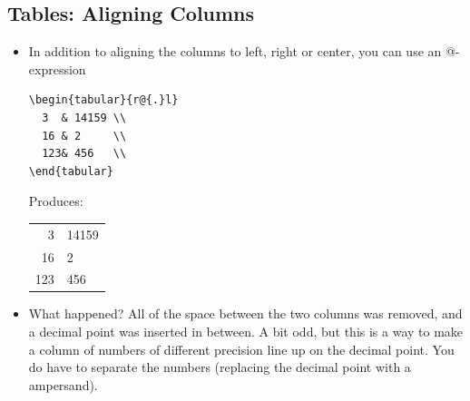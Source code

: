 \documentclass[usenames,dvipsnames]{beamer}
\begin{document}
\subsection{Tables: Aligning Columns}
\begin{frame}[fragile]{\insertsubsection}
\begin{itemize}

\item In addition to aligning the columns to left, right or center, you can use an @-expression 
\smallskip

\begin{exampletwouptinynoframe}
{\color{OliveGreen}\begin{Verbatim}[fontsize=\scriptsize]
\begin{tabular}{r@{.}l}
  3  & 14159 \\
  16 & 2     \\
  123& 456   \\
\end{tabular}
\end{Verbatim}}
\end{exampletwouptinynoframe}

\medskip

Produces:
\medskip

\begin{exampletwouptinynoframe}
{\color{Blue}\begin{tabular}{r@{.}l}
  3   & 14159 \\
  16  & 2     \\
  123 & 456   \\
\end{tabular}}
\end{exampletwouptinynoframe}
\item What happened? All of the space between the two columns was removed, and a decimal point was inserted in between. A bit odd, but this is a way to make a column of numbers of different precision line up on the decimal point. You do have to separate the numbers (replacing the decimal point with a ampersand).
\end{itemize}
\end{frame}
\end{document}

